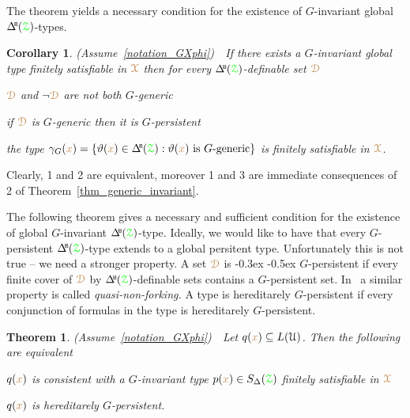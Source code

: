\documentclass[10pt,openany]{amsproc}
\makeatletter
\newcommand{\mylabel}[1]{{\ssf{#1}}\hfill}
\renewenvironment{itemize}
  {\begin{list}{}{%
   \setlength{\parskip}{0mm}
   \setlength{\topsep}{.2\baselineskip}
   \setlength{\rightmargin}{0mm}
   \setlength{\listparindent}{0mm}
   \setlength{\itemindent}{0mm}
   \setlength{\labelwidth}{2ex}
   \setlength{\itemsep}{.1\baselineskip}
   \setlength{\parsep}{0mm}
   \setlength{\partopsep}{0mm}
   \setlength{\labelsep}{1ex}
   \setlength{\leftmargin}{\labelwidth+\labelsep}
   \let\makelabel\mylabel
   }}
   {\vspace*{-.3\baselineskip}\end{list}}
\def\BDelta{\smash{\Delta\hskip-.4ex\raisebox{.8ex}{\tiny\sf B}}}
\def\D{\EuScript D}
\def\X{\EuScript X}
\def\Z{\EuScript Z}
\def\U{\EuScript U}
\def\theta{\vartheta}
\def\ssf#1{\textsf{\small #1}}
\newcounter{thm}
\theoremstyle{mio}
\newtheorem{theorem}[thm]{Theorem}\tcolorboxenvironment{theorem}{mythm}
\newtheorem{corollary}[thm]{Corollary}\tcolorboxenvironment{corollary}{mythm}
\providecommand{\proofNameStyle}{\bfseries}
\renewenvironment{proof}[1][\proofname]{\par
  \pushQED{\qed}%
  \normalfont%
  \trivlist
  \item[\hskip\labelsep
        \proofNameStyle
    #1\@addpunct{.}]\ignorespaces
}{%
  \popQED\endtrivlist\@endpefalse
}
\def\mr{\color{brown}}
\def\gr{\color{green}}
\def\mrD{{\mr\D}}
\def\mrX{{\mr\X}}
\def\grZ{{\gr\Z}}
\renewcommand*{\emph}[1]{%
\kern-0.3ex
\smash{\tikz[baseline]\node[rectangle, fill=black!20!yellow!50!white, rounded corners, inner xsep=0.5ex, inner ysep=0.2ex, anchor=base, minimum height = 2.7ex]{#1};}\kern-0.5ex
}
\makeatother
\begin{document}
The theorem yields a necessary condition for the existence of $G$-invariant global $\BDelta({\grZ})$-types.

\begin{corollary}\label{corol_def_mu}
  (Assume~\ref{notation_GXphi})\ \  
  If there exists a $G$-invariant global type finitely satisfiable in $\mrX$ then for every $\BDelta({\grZ})$-definable set $\mrD$
  \begin{itemize}
    \item[1.] $\mrD$ and $\neg\mrD$ are not both $G$-generic
    \item[2.] if $\mrD$ is $G$-generic then it is $G$-persistent
    \item[3.] the type $\gamma_G({\mr x})=\{\theta({\mr x})\in \BDelta({\grZ}): \theta({\mr x})\textrm{ is }G\textrm{-generic}\}$ is finitely satisfiable in $\mrX$.
  \end{itemize}
\end{corollary}

\begin{proof}
  Clearly, \ssf1 and \ssf2 are equivalent, moreover \ssf1 and \ssf3 are immediate consequences of \ssf2 of Theorem~\ref{thm_generic_invariant}.
\end{proof}

The following theorem gives a necessary and sufficient condition for the  existence of global $G$-invariant $\BDelta({\grZ})$-type.
Ideally, we would like to have that every $G$-persistent $\BDelta({\grZ})$-type extends to a global persitent type.
Unfortunately this is not true -- we need a stronger property.
A set $\mrD$ is \emph{hereditarely\/} $G$-persistent if every finite cover of $\mrD$ by $\BDelta({\grZ})$-definable sets contains a $G$-persistent set.
In~\cite{CK} a similar property is called \textit{quasi-non-forking.}
A type is hereditarely $G$-persistent if every conjunction of formulas in the type is hereditarely $G$-persistent.

\begin{theorem}\label{thm_generic_invariant2}
  (Assume~\ref{notation_GXphi})\ \  
  Let $q({\mr x})\subseteq L(\U)$.
  Then the following are equivalent 
  \begin{itemize}
    \item[1.] $q({\mr x})$ is consistent with a $G$-invariant type $p({\mr x})\in S_\Delta(\grZ)$ finitely satisfiable in $\mrX$
    \item[2.] $q({\mr x})$ is hereditarely $G$-persistent.
  \end{itemize}
\end{theorem}
\end{document}
